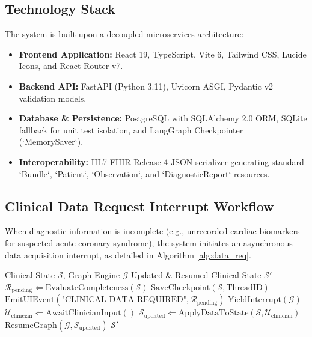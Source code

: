 \documentclass[conference]{IEEEtran}
\begin{document}
\subsection{Technology Stack}
The system is built upon a decoupled microservices architecture:
\begin{itemize}
    \item \textbf{Frontend Application:} React 19, TypeScript, Vite 6, Tailwind CSS, Lucide Icons, and React Router v7.
    \item \textbf{Backend API:} FastAPI (Python 3.11), Uvicorn ASGI, Pydantic v2 validation models.
    \item \textbf{Database \& Persistence:} PostgreSQL with SQLAlchemy 2.0 ORM, SQLite fallback for unit test isolation, and LangGraph Checkpointer (`MemorySaver`).
    \item \textbf{Interoperability:} HL7 FHIR Release 4 JSON serializer generating standard `Bundle`, `Patient`, `Observation`, and `DiagnosticReport` resources.
\end{itemize}

\subsection{Clinical Data Request Interrupt Workflow}
When diagnostic information is incomplete (e.g., unrecorded cardiac biomarkers for suspected acute coronary syndrome), the system initiates an asynchronous data acquisition interrupt, as detailed in Algorithm \ref{alg:data_req}.

\begin{algorithm}[h]
\caption{Dynamic Clinical Data Acquisition & Graph Resumption}
\label{alg:data_req}
\begin{algorithmic}[1]
\REQUIRE Clinical State $\mathcal{S}$, Graph Engine $\mathcal{G}$
\ENSURE Updated & Resumed Clinical State $\mathcal{S}'$
\STATE $\mathcal{R}_{\text{pending}} \Leftarrow \text{EvaluateCompleteness}(\mathcal{S})$
    \STATE $\text{SaveCheckpoint}(\mathcal{S}, \text{ThreadID})$
    \STATE $\text{EmitUIEvent}(\text{"CLINICAL\_DATA\_REQUIRED"}, \mathcal{R}_{\text{pending}})$
    \STATE $\text{YieldInterrupt}(\mathcal{G})$
    \STATE $\mathcal{U}_{\text{clinician}} \Leftarrow \text{AwaitClinicianInput}()$
    \STATE $\mathcal{S}_{\text{updated}} \Leftarrow \text{ApplyDataToState}(\mathcal{S}, \mathcal{U}_{\text{clinician}})$
    \STATE $\text{ResumeGraph}(\mathcal{G}, \mathcal{S}_{\text{updated}})$
\ENDIF
\RETURN $\mathcal{S}'$
\end{algorithmic}
\end{algorithm}
\end{document}
